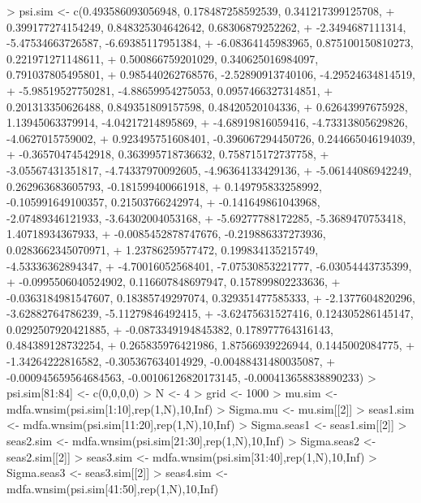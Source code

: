 \documentclass[a4paper]{book}
\begin{document}
\begin{Schunk}
\begin{Sinput}
> psi.sim <- c(0.493586093056948, 0.178487258592539, 0.341217399125708, 
+              0.399177274154249, 0.848325304642642, 0.68306879252262, 
+              -2.3494687111314, -5.47534663726587, -6.69385117951384, 
+              -6.08364145983965, 0.875100150810273, 0.221971271148611, 
+              0.500866759201029, 0.340625016984097, 0.791037805495801, 
+              0.985440262768576, -2.52890913740106, -4.29524634814519, 
+              -5.98519527750281, -4.88659954275053, 0.0957466327314851, 
+              0.201313350626488, 0.849351809157598, 0.48420520104336, 
+              0.62643997675928, 1.13945063379914, -4.04217214895869, 
+              -4.68919816059416, -4.73313805629826, -4.0627015759002,
+              0.923495751608401, -0.396067294450726, 0.244665046194039, 
+              -0.36570474542918, 0.363995718736632, 0.758715172737758, 
+              -3.05567431351817, -4.74337970092605, -4.96364133429136, 
+              -5.06144086942249, 0.262963683605793, -0.181599400661918, 
+              0.149795833258992, -0.105991649100357, 0.21503766242974, 
+              -0.141649861043968, -2.07489346121933, -3.64302004053168, 
+              -5.69277788172285, -5.3689470753418, 1.40718934367933,
+              -0.0085452878747676, -0.219886337273936, 0.0283662345070971,
+              1.23786259577472, 0.199834135215749, -4.53336362894347, 
+              -4.70016052568401, -7.07530853221777, -6.03054443735399, 
+              -0.0995506040524902, 0.116607848697947, 0.157899802233636, 
+              -0.0363184981547607, 0.18385749297074, 0.329351477585333, 
+              -2.1377604820296, -3.62882764786239, -5.11279846492415, 
+              -3.62475631527416, 0.124305286145147, 0.0292507920421885, 
+              -0.0873349194845382, 0.178977764316143, 0.484389128732254,
+              0.265835976421986, 1.87566939226944, 0.1445002084775, 
+              -1.34264222816582, -0.305367634014929, -0.00488431480035087, 
+              -0.000945659564684563, -0.00106126820173145, -0.000413658838890233)
> psi.sim[81:84] <- c(0,0,0,0)
> N <- 4
> grid <- 1000
> mu.sim <- mdfa.wnsim(psi.sim[1:10],rep(1,N),10,Inf)
> Sigma.mu <- mu.sim[[2]]
> seas1.sim <- mdfa.wnsim(psi.sim[11:20],rep(1,N),10,Inf)
> Sigma.seas1 <- seas1.sim[[2]]
> seas2.sim <- mdfa.wnsim(psi.sim[21:30],rep(1,N),10,Inf)
> Sigma.seas2 <- seas2.sim[[2]]
> seas3.sim <- mdfa.wnsim(psi.sim[31:40],rep(1,N),10,Inf)
> Sigma.seas3 <- seas3.sim[[2]]
> seas4.sim <- mdfa.wnsim(psi.sim[41:50],rep(1,N),10,Inf)

\end{Sinput}
\end{Schunk}
\end{document}
